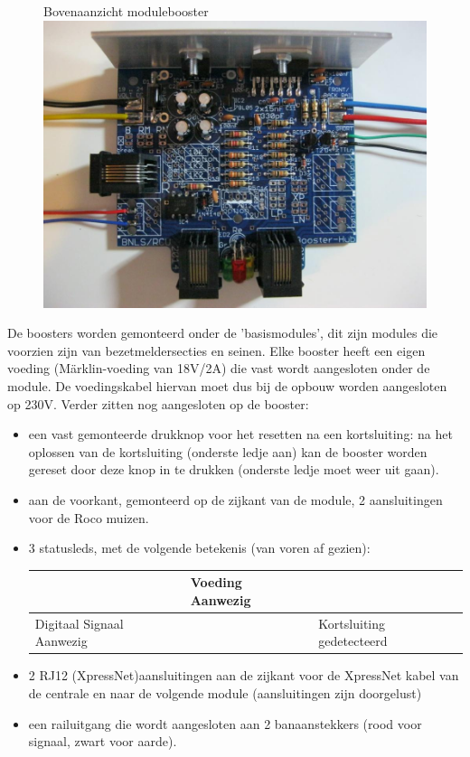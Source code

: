 \documentclass[12pt,a4paper]{report}
\newcommand*{\marklin}{M\"{a}rklin}
\begin{document}
\begin{figure}[!ht]
  \captionbox
  {Bovenaanzicht modulebooster\label{modulebooster}}
  {\includegraphics[scale=0.5]{images/rcu_foto3}\\}
\end{figure}

De boosters worden gemonteerd onder de 'basismodules', dit zijn modules die voorzien zijn van bezetmeldersecties en seinen. Elke booster heeft een eigen voeding (\marklin-voeding van 18V/2A) die vast wordt aangesloten onder de module. De voedingskabel hiervan moet dus bij de opbouw worden aangesloten op 230V.
Verder zitten nog aangesloten op de booster:
\begin{itemize}
\item een vast gemonteerde drukknop voor het resetten na een kortsluiting: na het oplossen van de kortsluiting (onderste ledje aan) kan de booster worden gereset door deze knop in te drukken (onderste ledje moet weer uit gaan).
\item aan de voorkant, gemonteerd op de zijkant van de module, 2 aansluitingen voor de Roco muizen.
\item 3 statusleds, met de volgende betekenis (van voren af gezien):\\

\begin{table}[!ht]
\centering
\label{my-label}
\begin{tabular}{l|l|l}
\cline{2-2}
                           & Voeding Aanwezig &                           \\ \hline
\multicolumn{1}{|l|}{Digitaal Signaal Aanwezig} &      & \multicolumn{1}{l|}{Kortsluiting gedetecteerd} \\ \cline{1-1} \cline{3-3} 
\end{tabular}
\end{table}

\item 2 RJ12 (XpressNet)aansluitingen aan de zijkant voor de XpressNet kabel van de centrale en naar de volgende module (aansluitingen zijn doorgelust)
\item een railuitgang die wordt aangesloten aan 2 banaanstekkers (rood voor signaal, zwart voor aarde).
\end{itemize}
\end{document}
